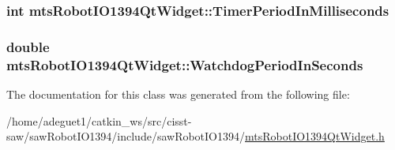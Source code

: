 \hypertarget{classmts_robot_i_o1394_qt_widget_a4fa3dd1b6769a8a4fc0c51b77dbf3413}{
\subsubsection[{Timer\-Period\-In\-Milliseconds}]{\setlength{\rightskip}{0pt plus 5cm}int mts\-Robot\-I\-O1394\-Qt\-Widget\-::\-Timer\-Period\-In\-Milliseconds\hspace{0.3cm}{\ttfamily [protected]}}}\label{classmts_robot_i_o1394_qt_widget_a4fa3dd1b6769a8a4fc0c51b77dbf3413}
\hypertarget{classmts_robot_i_o1394_qt_widget_a65cefe450636651de5c971d33119c6db}{
\subsubsection[{Watchdog\-Period\-In\-Seconds}]{\setlength{\rightskip}{0pt plus 5cm}double mts\-Robot\-I\-O1394\-Qt\-Widget\-::\-Watchdog\-Period\-In\-Seconds\hspace{0.3cm}{\ttfamily [protected]}}}\label{classmts_robot_i_o1394_qt_widget_a65cefe450636651de5c971d33119c6db}


The documentation for this class was generated from the following file\-:\begin{DoxyCompactItemize}
\item 
/home/adeguet1/catkin\-\_\-ws/src/cisst-\/saw/saw\-Robot\-I\-O1394/include/saw\-Robot\-I\-O1394/\hyperlink{mts_robot_i_o1394_qt_widget_8h}{mts\-Robot\-I\-O1394\-Qt\-Widget.\-h}\end{DoxyCompactItemize}

